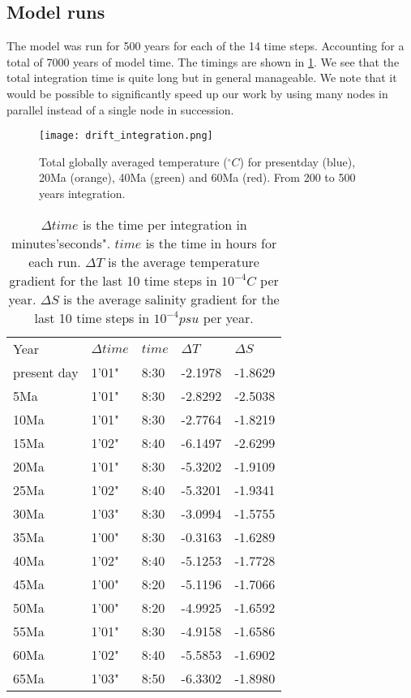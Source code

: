 \subsection{Model runs}
The model was run for 500 years for each of the 14 time steps. Accounting for a total of 7000 years of model time. The timings are shown in \cref{table:masteps}. We see that the total integration time is quite long but in general manageable. We note that it would be possible to significantly speed up our work by using many nodes in parallel instead of a single node in succession.
\begin{figure}[H]
	\texttt{[image: drift\_integration.png]}
	\caption{Total globally averaged temperature ($^{\circ}C$) for presentday (blue), 20Ma (orange), 40Ma (green) and 60Ma (red). From 200 to 500 years integration.}
	\label{fig:avtempgrph}
\end{figure}
\begin{table}[H]
	\centering
	\begin{tabular}{lllll}
Year & $\Delta time$ & $time$ & $\Delta T$& $\Delta S$\\
present day & 1'01" & 8:30& -2.1978& -1.8629\\
5Ma& 1'01" & 8:30& -2.8292& -2.5038 \\
10Ma & 1'01" & 8:30& -2.7764& -1.8219\\
15Ma & 1'02" & 8:40& -6.1497& -2.6299\\
20Ma & 1'01" & 8:30&  -5.3202& -1.9109\\
25Ma & 1'02" & 8:40& -5.3201& -1.9341\\
30Ma & 1'03" & 8:30& -3.0994& -1.5755\\
35Ma & 1'00" & 8:30& -0.3163&-1.6289\\
40Ma & 1'02" & 8:40& -5.1253& -1.7728\\
45Ma & 1'00" & 8:20& -5.1196& -1.7066\\
50Ma & 1'00" & 8:20& -4.9925& -1.6592\\
55Ma & 1'01" & 8:30& -4.9158& -1.6586\\
60Ma & 1'02" & 8:40& -5.5853& -1.6902\\
65Ma & 1'03" & 8:50& -6.3302& -1.8980\\
	\end{tabular}

\caption{$\Delta time$ is the time per integration in minutes'seconds". $time$ is the time in hours for each run. $\Delta T$ is the average temperature gradient for the last 10 time steps in $10^{-4} C$ per year. $\Delta S$ is the average salinity gradient for the last 10 time steps in $10^{-4} psu$ per year.}
\label{table:masteps}
\end{table}



